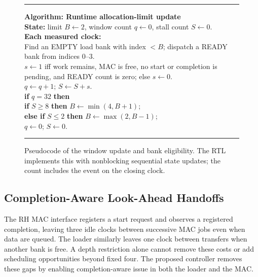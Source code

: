 \documentclass[twocolumn,10pt]{article}
\begin{document}
\begin{figure}[t]
\small
\hrule\vspace{3pt}
\noindent\textbf{Algorithm: Runtime allocation-limit update}\\[2pt]
\noindent\textbf{State:} limit $B\leftarrow 2$, window count $q\leftarrow 0$,
stall count $S\leftarrow 0$.\\
\noindent\textbf{Each measured clock:}\\
\hspace*{1em}Find an EMPTY load bank with index $<B$; dispatch a READY
bank from indices $0$--$3$.\\
\hspace*{1em}$s\leftarrow 1$ iff work remains, MAC is free, no start or
completion is pending, and READY count is zero; else $s\leftarrow 0$.\\
\hspace*{1em}$q\leftarrow q+1$; $S\leftarrow S+s$.\\
\hspace*{1em}\textbf{if} $q=32$ \textbf{then}\\
\hspace*{2em}\textbf{if} $S\geq8$ \textbf{then} $B\leftarrow\min(4,B+1)$;\\
\hspace*{2em}\textbf{else if} $S\leq2$ \textbf{then}
$B\leftarrow\max(2,B-1)$;\\
\hspace*{2em}$q\leftarrow0$; $S\leftarrow0$.\\
\vspace{3pt}\hrule
\caption{Pseudocode of the window update and bank eligibility. The RTL
implements this with nonblocking sequential state updates; the count
includes the event on the closing clock.}
\label{alg:mode}
\end{figure}

\subsection{Completion-Aware Look-Ahead Handoffs}
The RH MAC interface registers a start request and observes a
registered completion, leaving three idle clocks between successive MAC
jobs even when data are queued. The loader similarly leaves one clock
between transfers when another bank is free. A depth restriction alone
cannot remove these costs or add scheduling opportunities beyond fixed
four. The proposed controller removes these gaps by enabling
completion-aware issue in both the loader and the MAC.
\end{document}

